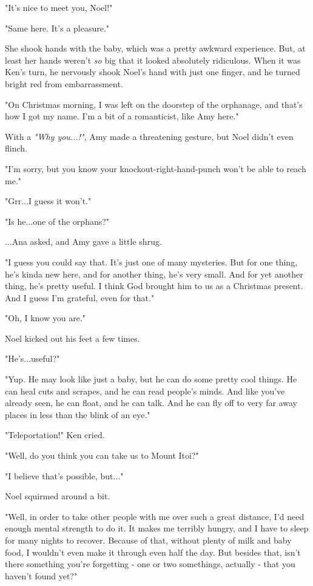 \documentclass[
]{article}
\begin{document}
"It's nice to meet you, Noel!"

"Same here. It's a pleasure."

She shook hands with the baby, which was a pretty awkward experience.
But, at least her hands weren't \emph{so} big that it looked absolutely
ridiculous. When it was Ken's turn, he nervously shook Noel's hand with
just one finger, and he turned bright red from embarrassment.

"On Christmas morning, I was left on the doorstep of the orphanage, and
that's how I got my name. I'm a bit of a romanticist, like Amy here."

With a \emph{"Why you...!"}, Amy made a threatening gesture, but Noel
didn't even flinch.

"I'm sorry, but you know your knockout-right-hand-punch won't be able to
reach me."

"Grr...I guess it won't."

"Is he...one of the orphans?"

...Ana asked, and Amy gave a little shrug.

"I guess you could say that. It's just one of many mysteries. But for
one thing, he's kinda new here, and for another thing, he's very small.
And for yet another thing, he's pretty useful. I think God brought him
to us as a Christmas present. And I guess I'm grateful, even for that."

"Oh, I know you are."

Noel kicked out his feet a few times.

"He's...useful?"

"Yup. He may look like just a baby, but he can do some pretty cool
things. He can heal cuts and scrapes, and he can read people's minds.
And like you've already seen, he can float, and he can talk. And he can
fly off to very far away places in less than the blink of an eye."

"Teleportation!" Ken cried.

"Well, do you think you can take us to Mount Itoi?"

"I believe that's possible, but..."

Noel squirmed around a bit.

"Well, in order to take other people with me over such a great distance,
I'd need enough mental strength to do it. It makes me terribly hungry,
and I have to sleep for many nights to recover. Because of that, without
plenty of milk and baby food, I wouldn't even make it through even half
the day. But besides that, isn't there something you're forgetting - one
or two somethings, actually - that you haven't found yet?"
\end{document}
